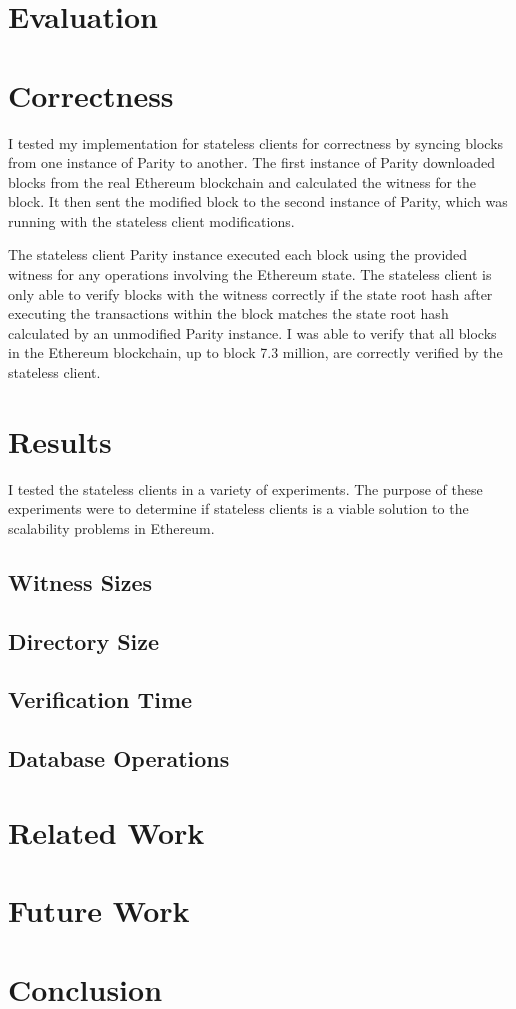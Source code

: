 \documentclass[12pt]{article}
\begin{document}
\section{Evaluation}

\section{Correctness}

I tested my implementation for stateless clients for correctness by syncing blocks from one instance of Parity to another. The first instance of Parity downloaded blocks from the real Ethereum blockchain and calculated the witness for the block. It then sent the modified block to the second instance of Parity, which was running with the stateless client modifications.

The stateless client Parity instance executed each block using the provided witness for any operations involving the Ethereum state. The stateless client is only able to verify blocks with the witness correctly if the state root hash after executing the transactions within the block matches the state root hash calculated by an unmodified Parity instance. I was able to verify that all blocks in the Ethereum blockchain, up to block 7.3 million, are correctly verified by the stateless client.

\section{Results}

I tested the stateless clients in a variety of experiments. The purpose of these experiments were to determine if stateless clients is a viable solution to the scalability problems in Ethereum.

\subsection{Witness Sizes}

\subsection{Directory Size}

\subsection{Verification Time}

\subsection{Database Operations}

\section{Related Work}

\section{Future Work}

\section{Conclusion}
\end{document}
